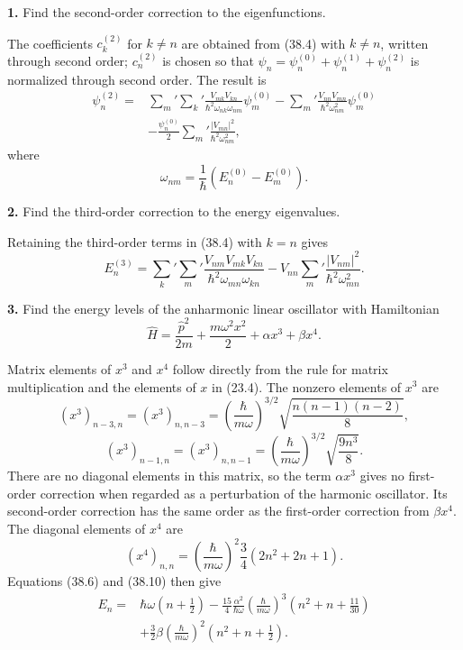 \begin{center}\ProblemHeading\end{center}

\textbf{1.} Find the second-order correction to the eigenfunctions.

\SolutionHeading The coefficients $c_k^{(2)}$ for $k\ne n$ are obtained from
(38.4) with $k\ne n$, written through second order; $c_n^{(2)}$ is chosen so
that $\psi_n=\psi_n^{(0)}+\psi_n^{(1)}+\psi_n^{(2)}$ is
normalized through second order. The result is
\[
 \begin{aligned}
  \psi_n^{(2)}={}&
  \sum_m'\sum_k'\frac{V_{mk}V_{kn}}{\hbar^2\omega_{nk}\omega_{nm}}
      \psi_m^{(0)}
  -\sum_m'\frac{V_{nn}V_{mn}}{\hbar^2\omega_{nm}^2}\psi_m^{(0)}\\
  &-\frac{\psi_n^{(0)}}2
  \sum_m'\frac{|V_{mn}|^2}{\hbar^2\omega_{nm}^2},
 \end{aligned}
\]
where
\[
  \omega_{nm}=\frac1\hbar(E_n^{(0)}-E_m^{(0)}).
\]

\textbf{2.} Find the third-order correction to the energy eigenvalues.

\SolutionHeading Retaining the third-order terms in (38.4) with $k=n$ gives
\[
  E_n^{(3)}=\sum_k'\sum_m'
  \frac{V_{nm}V_{mk}V_{kn}}{\hbar^2\omega_{mn}\omega_{kn}}
  -V_{nn}\sum_m'\frac{|V_{nm}|^2}{\hbar^2\omega_{mn}^2}.
\]

\textbf{3.} Find the energy levels of the anharmonic linear oscillator with
Hamiltonian
\[
  \hat H=\frac{\hat p^2}{2m}+\frac{m\omega^2x^2}{2}+\alpha x^3+\beta x^4.
\]

\SolutionHeading Matrix elements of $x^3$ and $x^4$ follow directly from the
rule for matrix multiplication and the elements of $x$ in (23.4). The nonzero
elements of $x^3$ are
\[
  (x^3)_{n-3,n}=(x^3)_{n,n-3}
  =\left(\frac\hbar{m\omega}\right)^{3/2}
   \sqrt{\frac{n(n-1)(n-2)}8},
\]
\[
  (x^3)_{n-1,n}=(x^3)_{n,n-1}
  =\left(\frac\hbar{m\omega}\right)^{3/2}
   \sqrt{\frac{9n^3}{8}}.
\]
There are no diagonal elements in this matrix, so the term $\alpha x^3$
gives no first-order correction when regarded as a perturbation of the
harmonic oscillator. Its second-order correction has the same order as the
first-order correction from $\beta x^4$. The diagonal elements of $x^4$ are
\[
  (x^4)_{n,n}=\left(\frac\hbar{m\omega}\right)^2
  \frac34(2n^2+2n+1).
\]
Equations (38.6) and (38.10) then give
\[
 \begin{aligned}
  E_n={}&\hbar\omega\left(n+\frac12\right)
  -\frac{15}{4}\frac{\alpha^2}{\hbar\omega}
   \left(\frac\hbar{m\omega}\right)^3
   \left(n^2+n+\frac{11}{30}\right)\\
  &+\frac32\beta\left(\frac\hbar{m\omega}\right)^2
   \left(n^2+n+\frac12\right).
 \end{aligned}
\]

